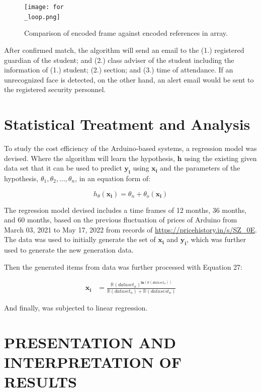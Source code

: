 \documentclass[12pt]{article}
\begin{document}
\begin{figure}[h!]
	\centering
	\texttt{[image: for\\\_loop.png]}
	\caption{Comparison of encoded frame against encoded references in array.}
\end{figure}

After confirmed match, the algorithm will send an email to the (1.) registered guardian of the student; and (2.) class adviser of the student including the information of (1.) student; (2.) section; and (3.) time of attendance. If an unrecognized face is detected, on the other hand, an alert email would be sent to the registered security personnel.

\section*{Statistical Treatment and Analysis\centering}

To study the cost efficiency of the Arduino-based systems, a regression model was devised. Where the algorithm will learn the hypothesis, $\mathbf{h}$ using the existing given data set that it can be used to predict $\boldsymbol{y_i}$ using $\boldsymbol{x_i}$ and the parameters of the hypothesis, $\theta_1, \theta_2, \dots, \theta_n$, in an equation form of: 

\begin{equation}
	h_\theta (\boldsymbol{x_i}) = \theta_n + \theta_o (\boldsymbol{x_i})
\end{equation}

The regression model devised includes a time frames of 12 months, 36 months, and 60 months, based on the previous fluctuation of prices of Arduino from March 03, 2021 to May 17, 2022 from records of \href{pricehistory.in}{https://pricehistory.in/s/SZ\_0E}. The data was used to initially generate the set of $\boldsymbol{x_i}$ and $\boldsymbol{y_i}$, which was further used to generate the new generation data.

Then the generated items from data was further processed with Equation 27:

\begin{align}
	\boldsymbol{x_i} &= \frac{\mathbb{R}(dataset_{n})^{\boldsymbol{ln}(\mathbb{R}(dataset_{n}))}}{\mathbb{R}(dataset_{n})+\mathbb{R}(datasest_{n})}
\end{align}	

And finally, was subjected to linear regression.

\newpage
\section*{PRESENTATION AND INTERPRETATION OF RESULTS\centering}
\end{document}
